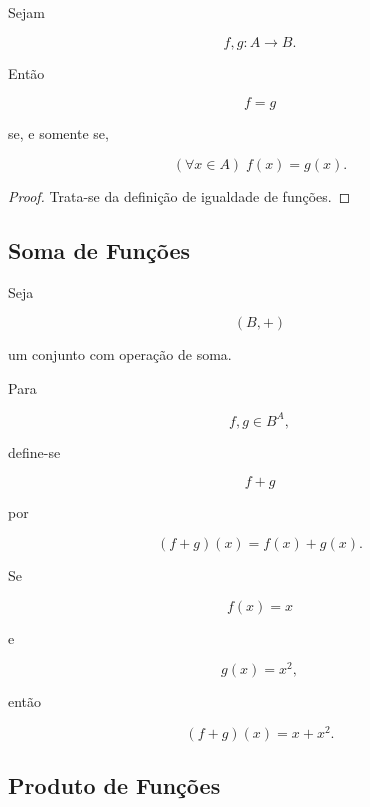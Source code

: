 \documentclass[../../main]{subfiles}
\begin{document}
\begin{prop}
	\label{prop:matematica:funcoes:operacoes:extensionalidade}

	Sejam

	\[
		f,g:A\to B.
	\]

	Então

	\[
		f=g
	\]

	se, e somente se,

	\[
		(\forall x\in A)
		\;
		f(x)=g(x).
	\]

\end{prop}

\begin{proof}

	Trata-se da definição de igualdade de funções.

\end{proof}

\subsection{Soma de Funções}

\begin{defn}[Soma]
	\label{def:matematica:funcoes:operacoes:soma}

	Seja

	\[
		(B,+)
	\]

	um conjunto com operação de soma.

	Para

	\[
		f,g\in B^A,
	\]

	define-se

	\[
		f+g
	\]

	por

	\[
		(f+g)(x)
		=
		f(x)+g(x).
	\]

\end{defn}

\begin{ex}

	Se

	\[
		f(x)=x
	\]

	e

	\[
		g(x)=x^2,
	\]

	então

	\[
		(f+g)(x)
		=
		x+x^2.
	\]

\end{ex}

\subsection{Produto de Funções}
\end{document}
